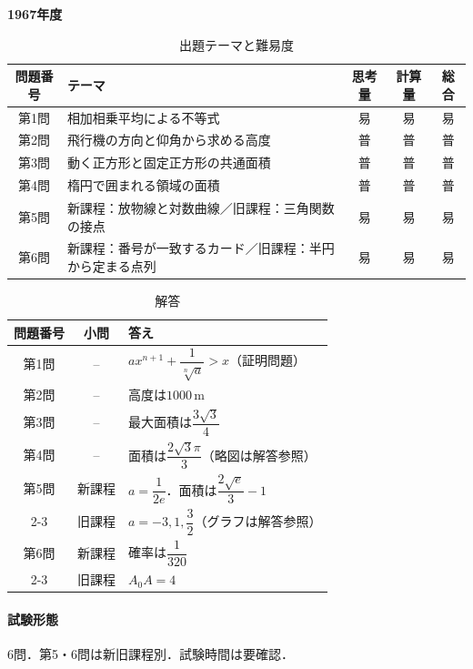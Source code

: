 \documentclass[../../main.tex]{subfiles}
\begin{document}
\begin{center}
  {\fontsize{48pt}{58pt}\selectfont \textbf{1967}\normalsize\textbf{年度}}
\end{center}

\begin{table}[htb]
  \centering
  \caption{出題テーマと難易度}
  \begin{tabular}{|c|p{6.2cm}|c|c|c|}
    \hline
    \textbf{問題番号} & \textbf{テーマ} & \textbf{思考量} & \textbf{計算量} & \textbf{総合} \\
    \hline
    第1問 & 相加相乗平均による不等式 & 易 & 易 & 易 \\
    \hline
    第2問 & 飛行機の方向と仰角から求める高度 & 普 & 普 & 普 \\
    \hline
    第3問 & 動く正方形と固定正方形の共通面積 & 普 & 普 & 普 \\
    \hline
    第4問 & 楕円で囲まれる領域の面積 & 普 & 普 & 普 \\
    \hline
    第5問 & 新課程：放物線と対数曲線／旧課程：三角関数の接点 & 易 & 易 & 易 \\
    \hline
    第6問 & 新課程：番号が一致するカード／旧課程：半円から定まる点列 & 易 & 易 & 易 \\
    \hline
  \end{tabular}
\end{table}

\begin{table}[htb]
  \centering
  \caption{解答}
  \renewcommand{\arraystretch}{1.4}
  \begin{tabular}{|c|c|p{9cm}|}
    \hline
    \textbf{問題番号} & \textbf{小問} & \textbf{答え} \\
    \hline
    第1問 & -- & $ax^{n+1}+\dfrac{1}{\sqrt[n]{a}}>x$（証明問題） \\
    \hline
    第2問 & -- & 高度は$1000\,\mathrm{m}$ \\
    \hline
    第3問 & -- & 最大面積は$\dfrac{3\sqrt{3}}{4}$ \\
    \hline
    第4問 & -- & 面積は$\dfrac{2\sqrt{3}\pi}{3}$（略図は解答参照） \\
    \hline
    第5問 & 新課程 & $a=\dfrac{1}{2e}$．面積は$\dfrac{2\sqrt{e}}{3}-1$ \\
    \cline{2-3}
    & 旧課程 & $a=-3,1,\dfrac{3}{2}$（グラフは解答参照） \\
    \hline
    第6問 & 新課程 & 確率は$\dfrac{1}{320}$ \\
    \cline{2-3}
    & 旧課程 & $A_0A=4$ \\
    \hline
  \end{tabular}
\end{table}

\paragraph{試験形態}
6問．第5・6問は新旧課程別．試験時間は要確認．
\end{document}
